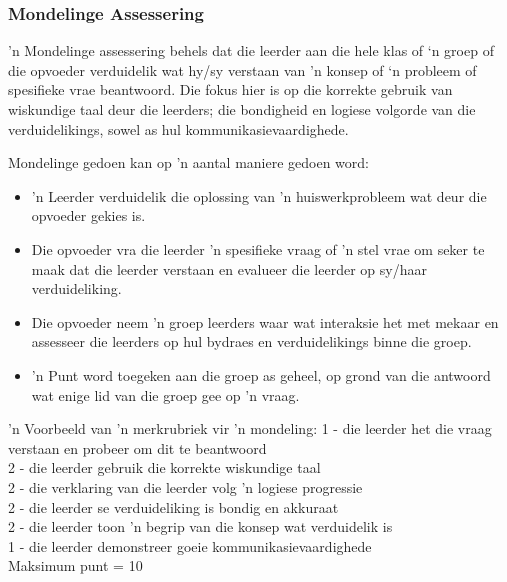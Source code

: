 \subsubsection{Mondelinge Assessering}
'n Mondelinge assessering behels dat die leerder aan die hele klas of ‘n groep of die opvoeder verduidelik wat hy/sy verstaan van 'n konsep of ‘n probleem of spesifieke vrae beantwoord. Die fokus hier is op die korrekte gebruik van wiskundige taal deur die leerders; die bondigheid en logiese volgorde van die verduidelikings, sowel as hul kommunikasievaardighede.\par
Mondelinge gedoen kan op 'n aantal maniere gedoen word:
\begin{itemize}[noitemsep]
\item
  'n Leerder verduidelik die oplossing van 'n ​​huiswerkprobleem wat deur die opvoeder gekies is.
\item
  Die opvoeder vra die leerder 'n spesifieke vraag of 'n stel vrae om seker te maak dat die leerder verstaan en evalueer die leerder op sy/haar verduideliking.
\item
  Die opvoeder neem 'n groep leerders waar wat interaksie het met mekaar en assesseer die leerders op hul bydraes en verduidelikings binne die groep.
\item
  'n Punt word toegeken aan die groep as geheel, op grond van die antwoord wat enige lid van die groep gee op 'n vraag.
\end{itemize}
'n Voorbeeld van 'n merkrubriek vir 'n mondeling:
1 - die leerder het die vraag verstaan en probeer om dit te beantwoord\\
2 - die leerder gebruik die korrekte wiskundige taal\\
2 - die verklaring van die leerder volg 'n logiese progressie\\
2 - die leerder se verduideliking is bondig en akkuraat\\
2 - die leerder toon 'n begrip van die konsep wat verduidelik is\\
1 - die leerder demonstreer goeie kommunikasievaardighede\\
Maksimum punt = 10\\
\\

